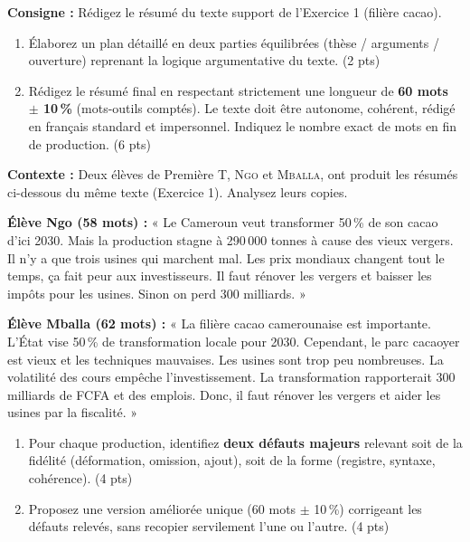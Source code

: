 \documentclass[11pt]{article}
\begin{document}
\begin{exercice}
\textbf{Consigne :} Rédigez le résumé du texte support de l'Exercice 1 (filière cacao).
\begin{enumerate}
    \item Élaborez un plan détaillé en deux parties équilibrées (thèse / arguments / ouverture) reprenant la logique argumentative du texte. (2 pts)
    \item Rédigez le résumé final en respectant strictement une longueur de \textbf{60 mots $\pm$ 10\,\%} (mots-outils comptés). Le texte doit être autonome, cohérent, rédigé en français standard et impersonnel. Indiquez le nombre exact de mots en fin de production. (6 pts)
\end{enumerate}
\end{exercice}

\begin{exercice}
\textbf{Contexte :} Deux élèves de Première T, \textsc{Ngo} et \textsc{Mballa}, ont produit les résumés ci-dessous du même texte (Exercice 1). Analysez leurs copies.

\textbf{Élève Ngo (58 mots) :} « Le Cameroun veut transformer 50\,\% de son cacao d'ici 2030. Mais la production stagne à 290\,000 tonnes à cause des vieux vergers. Il n'y a que trois usines qui marchent mal. Les prix mondiaux changent tout le temps, ça fait peur aux investisseurs. Il faut rénover les vergers et baisser les impôts pour les usines. Sinon on perd 300 milliards. »

\textbf{Élève Mballa (62 mots) :} « La filière cacao camerounaise est importante. L'État vise 50\,\% de transformation locale pour 2030. Cependant, le parc cacaoyer est vieux et les techniques mauvaises. Les usines sont trop peu nombreuses. La volatilité des cours empêche l'investissement. La transformation rapporterait 300 milliards de FCFA et des emplois. Donc, il faut rénover les vergers et aider les usines par la fiscalité. »

\begin{enumerate}
    \item Pour chaque production, identifiez \textbf{deux défauts majeurs} relevant soit de la fidélité (déformation, omission, ajout), soit de la forme (registre, syntaxe, cohérence). (4 pts)
    \item Proposez une version améliorée unique (60 mots $\pm$ 10\,\%) corrigeant les défauts relevés, sans recopier servilement l'une ou l'autre. (4 pts)
\end{enumerate}
\end{exercice}
\end{document}
